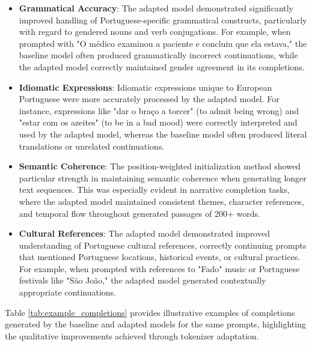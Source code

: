 \begin{itemize}
    \item \textbf{Grammatical Accuracy}: The adapted model demonstrated significantly improved handling of Portuguese-specific grammatical constructs, particularly with regard to gendered nouns and verb conjugations. For example, when prompted with "O médico examinou a paciente e concluiu que ela estava," the baseline model often produced grammatically incorrect continuations, while the adapted model correctly maintained gender agreement in its completions.
    
    \item \textbf{Idiomatic Expressions}: Idiomatic expressions unique to European Portuguese were more accurately processed by the adapted model. For instance, expressions like "dar o braço a torcer" (to admit being wrong) and "estar com os azeites" (to be in a bad mood) were correctly interpreted and used by the adapted model, whereas the baseline model often produced literal translations or unrelated continuations.
    
    \item \textbf{Semantic Coherence}: The position-weighted initialization method showed particular strength in maintaining semantic coherence when generating longer text sequences. This was especially evident in narrative completion tasks, where the adapted model maintained consistent themes, character references, and temporal flow throughout generated passages of 200+ words.
    
    \item \textbf{Cultural References}: The adapted model demonstrated improved understanding of Portuguese cultural references, correctly continuing prompts that mentioned Portuguese locations, historical events, or cultural practices. For example, when prompted with references to "Fado" music or Portuguese festivals like "São João," the adapted model generated contextually appropriate continuations.
\end{itemize}

Table \ref{tab:example_completions} provides illustrative examples of completions generated by the baseline and adapted models for the same prompts, highlighting the qualitative improvements achieved through tokenizer adaptation.

